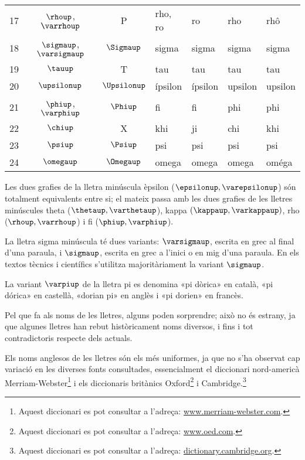 \begin{center}
\begin{tabular}{cccllll}
   17 & $\rhoup$, $\varrhoup$ & P & rho, ro & ro &  rho & rhô\\
   18 & $\sigmaup$, $\varsigmaup$ & $\Sigmaup$ & sigma & sigma &  sigma &sigma\\
   19 & $\tauup$ & T & tau & tau & tau &tau\\
   20 & $\upsilonup$ & $\Upsilonup$ & ípsilon & ípsilon &  upsilon &upsilon\\
   21 & $\phiup$, $\varphiup$ & $\Phiup$ & fi & fi &  phi & phi\\
   22 & $\chiup$ & X & khi & ji &  chi & khi\\
   23 & $\psiup$ & $\Psiup$ & psi & psi &  psi & psi\\
   24 & $\omegaup$ & $\Omegaup$ & omega & omega &  omega & oméga\\
   \bottomrule[1pt]
   \end{tabular}
\end{center}
\pagebreak


Les dues grafies de la lletra minúscula èpsilon  ($\epsilonup,
\varepsilonup$) són totalment equivalents entre si; el mateix passa
amb les dues grafies de les lletres minúscules theta ($\thetaup,
\varthetaup$), kappa $(\kappaup, \varkappaup)$, rho ($\rhoup,\varrhoup$) i fi ($\phiup, \varphiup$).

La lletra sigma minúscula té dues variants: $\varsigmaup$, escrita en
grec al final d'una paraula, i $\sigmaup$, escrita en grec a l'inici o
en mig d'una paraula. En els textos tècnics i científics s'utilitza
majoritàriament la variant $\sigmaup$.

La variant $\varpiup$ de la lletra pi es denomina «pi dòrica» en
català, «pi dórica» en castellà, «dorian pi» en anglès i «pi dorien» en francès.

Pel que fa als noms de les lletres, alguns poden sorprendre; això no
és estrany, ja que algunes lletres han rebut històricament noms
diversos, i fins i tot contradictoris respecte dels actuals.

Els noms anglesos de les lletres són els més uniformes, ja que no
s'ha observat cap variació en les diverses fonts consultades, essencialment el diccionari nord-americà Merriam-Webster\footnote{Aquest diccionari es pot consultar a l'adreça: \href{https://www.merriam-webster.com/}{www.merriam-webster.com}.} i els diccionaris britànics Oxford\footnote{Aquest diccionari es pot consultar a l'adreça: \href{http://www.oed.com/}{www.oed.com}.} i Cambridge.\footnote{Aquest diccionari es pot consultar a l'adreça: \href{http://dictionary.cambridge.org/}{dictionary.cambridge.org}.}

